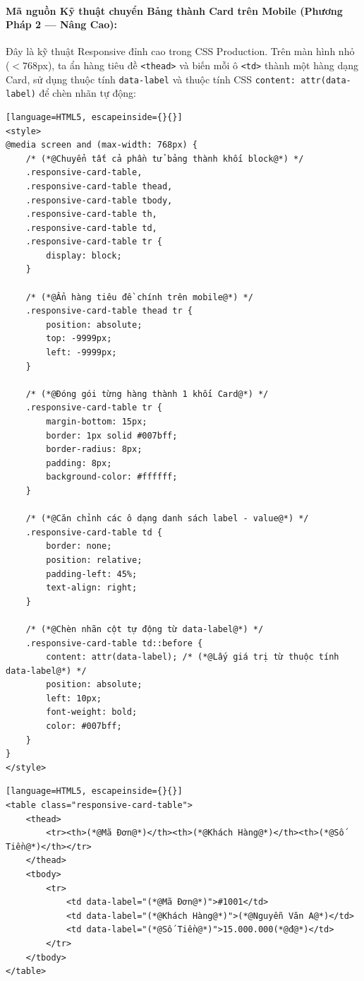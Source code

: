 \documentclass[11pt,oneside]{book}
\newcommand{\codeinline}[1]{\textcolor{accentOrange}{\texttt{#1}}}
\begin{document}
\paragraph{Mã nguồn Kỹ thuật chuyển Bảng thành Card trên Mobile (Phương Pháp 2 --- Nâng Cao):}
Đây là kỹ thuật Responsive đỉnh cao trong CSS Production. Trên màn hình nhỏ ($<768$px), ta ẩn hàng tiêu đề \codeinline{<thead>} và biến mỗi ô \codeinline{<td>} thành một hàng dạng Card, sử dụng thuộc tính \codeinline{data-label} và thuộc tính CSS \codeinline{content: attr(data-label)} để chèn nhãn tự động:

\begin{codeWindow}
\begin{lstlisting}[language=HTML5, escapeinside={}{}]
<style>
@media screen and (max-width: 768px) {
    /* (*@Chuyển tất cả phần tử bảng thành khối block@*) */
    .responsive-card-table, 
    .responsive-card-table thead, 
    .responsive-card-table tbody, 
    .responsive-card-table th, 
    .responsive-card-table td, 
    .responsive-card-table tr {
        display: block;
    }

    /* (*@Ẩn hàng tiêu đề chính trên mobile@*) */
    .responsive-card-table thead tr {
        position: absolute;
        top: -9999px;
        left: -9999px;
    }

    /* (*@Đóng gói từng hàng thành 1 khối Card@*) */
    .responsive-card-table tr {
        margin-bottom: 15px;
        border: 1px solid #007bff;
        border-radius: 8px;
        padding: 8px;
        background-color: #ffffff;
    }

    /* (*@Căn chỉnh các ô dạng danh sách label - value@*) */
    .responsive-card-table td {
        border: none;
        position: relative;
        padding-left: 45%;
        text-align: right;
    }

    /* (*@Chèn nhãn cột tự động từ data-label@*) */
    .responsive-card-table td::before {
        content: attr(data-label); /* (*@Lấy giá trị từ thuộc tính data-label@*) */
        position: absolute;
        left: 10px;
        font-weight: bold;
        color: #007bff;
    }
}
</style>
\end{lstlisting}
\end{codeWindow}

\begin{codeWindow}
\begin{lstlisting}[language=HTML5, escapeinside={}{}]
<table class="responsive-card-table">
    <thead>
        <tr><th>(*@Mã Đơn@*)</th><th>(*@Khách Hàng@*)</th><th>(*@Số Tiền@*)</th></tr>
    </thead>
    <tbody>
        <tr>
            <td data-label="(*@Mã Đơn@*)">#1001</td>
            <td data-label="(*@Khách Hàng@*)">(*@Nguyễn Văn A@*)</td>
            <td data-label="(*@Số Tiền@*)">15.000.000(*@đ@*)</td>
        </tr>
    </tbody>
</table>
\end{lstlisting}
\end{codeWindow}
\end{document}
